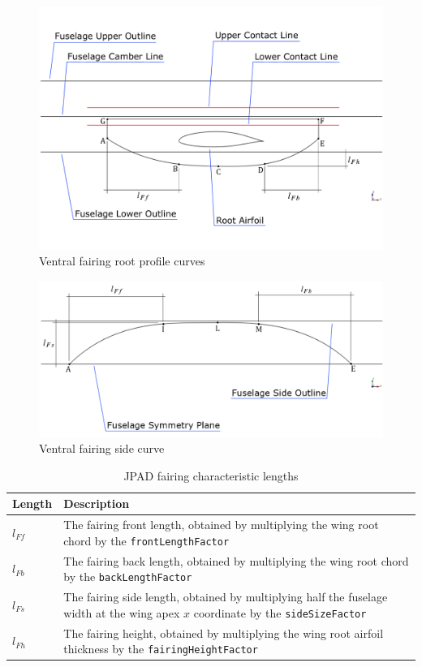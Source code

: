 %
\begin{figure}[H]
\centering
\includegraphics[scale=0.50]{Immagini/Appendice/Fairing/fairing_01}
\caption{Ventral fairing root profile curves}
\label{fig:fairing_01}
\end{figure}
%
\begin{figure}[H]
\centering
\includegraphics[scale=0.50]{Immagini/Appendice/Fairing/fairing_03}
\caption{Ventral fairing side curve}
\label{fig:fairing_02}
\end{figure}
%  
\bigskip
\begin{table}[H]
\centering
\begin{tabular}{p{1.5cm}p{9.0cm}}
\toprule
\textbf{Length} & \textbf{Description} \\
\midrule
$l_{Ff}$ & The fairing front length, obtained by multiplying the wing root chord by the \lstinline[language=Java]!frontLengthFactor! \\[0.2cm]
$l_{Fb}$ & The fairing back length, obtained by multiplying the wing root chord by the \lstinline[language=Java]!backLengthFactor! \\[0.2cm]
$l_{Fs}$ & The fairing side length, obtained by multiplying half the fuselage width at the wing apex $x$ coordinate by the \lstinline[language=Java]!sideSizeFactor! \\[0.2cm]
$l_{Fh}$ & The fairing height, obtained by multiplying the wing root airfoil thickness by the \lstinline[language=Java]!fairingHeightFactor! \\
\bottomrule
\end{tabular}
\caption{JPAD fairing characteristic lengths}
\label{tab:FairingCharacteristicLengths}
\end{table}
% 

